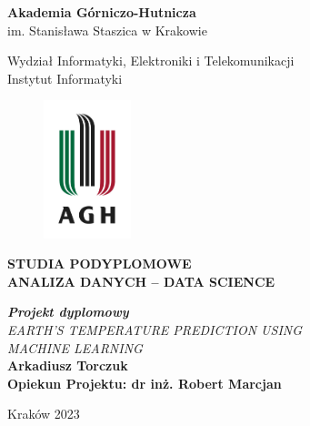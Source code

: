 \thispagestyle{empty}
\begin{center}{\sc \huge
\textbf{Akademia Górniczo-Hutnicza}\\
{\large
im. Stanisława Staszica w Krakowie\\    
}
}\par\vspace{0.6cm}\par
{\large
    Wydział Informatyki, Elektroniki i Telekomunikacji\\
    \vspace{0.6cm}
    Instytut Informatyki\\
}

\begin{figure}[ht!]
\centering
\includegraphics[height=40mm]{logo}
\end{figure}

\textbf{\large
    STUDIA PODYPLOMOWE\\
    ANALIZA DANYCH – DATA SCIENCE\\
}
\vspace{0.6cm}

\textit{\textbf{\Large
   Projekt dyplomowy\\
}}
\vspace{1.2cm}
\textit{\large
    EARTH'S TEMPERATURE PREDICTION USING\\
    MACHINE LEARNING\\
}
\vspace{0.6cm}
\textbf{\normalsize
   Arkadiusz Torczuk\\
   \vspace{1.8cm}
   Opiekun Projektu: dr inż. Robert Marcjan
}

\end{center}


\vfill
\begin{center}
Kraków 2023
\end{center}

